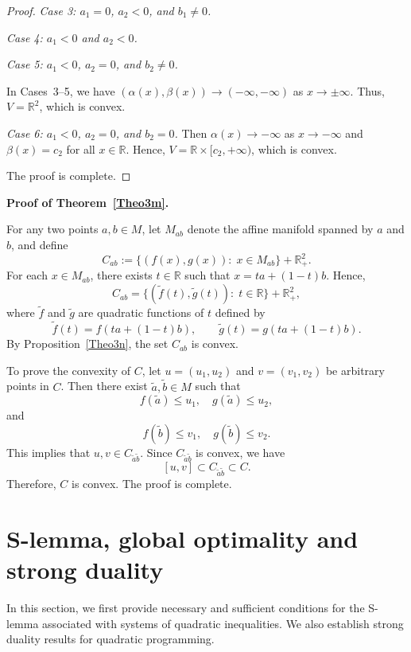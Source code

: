 \documentclass[]{interact}
\theoremstyle{plain}%
\theoremstyle{definition}
\theoremstyle{remark}
\begin{document}
\begin{proof}
		\medskip
		\noindent
		{\it Case 3: $a_1=0$, $a_2<0$, and $b_1\neq 0$.}
		
		\noindent
		{\it Case 4: $a_1<0$ and $a_2<0$.}
		
		\noindent
		{\it Case 5: $a_1<0$, $a_2=0$, and $b_2\neq 0$.}
		
		In Cases~3--5, we have $(\alpha(x),\beta(x))\to (-\infty,-\infty)$ as $x\to \pm\infty$. Thus, $V=\mathbb{R}^2$, which is convex.
		
		\medskip
		\noindent
		{\it Case 6: $a_1<0$, $a_2=0$, and $b_2=0$.}
		Then $\alpha(x)\to -\infty$ as $x\to -\infty$ and $\beta(x)=c_2$ for all $x\in \mathbb{R}$. Hence,
		$V=\mathbb{R}\times[c_2,+\infty)$, which is convex.
		
		The proof is complete.
	\end{proof}
	
	\medskip
	\noindent
	\textbf{Proof of Theorem~\ref{Theo3m}.}
	
	For any two points $a,b\in M$, let $M_{ab}$ denote the affine manifold spanned by $a$ and $b$, and define
	$$
	C_{ab}:= \{(f(x), g(x)):\; x\in M_{ab}\}+\mathbb{R}^{2}_+.
	$$
	For each $x\in M_{ab}$, there exists $t\in \mathbb{R}$ such that $x=ta+(1-t)b$. Hence,
	$$
	C_{ab}= \{(\tilde f(t), \tilde g(t)):\; t\in \mathbb{R}\}+\mathbb{R}^{2}_+,
	$$
	where $\tilde f$ and $\tilde g$ are quadratic functions of $t$ defined by
	$$
	\tilde f(t)=f(ta+(1-t)b), \qquad
	\tilde g(t)=g(ta+(1-t)b).
	$$
	By Proposition~\ref{Theo3n}, the set $C_{ab}$ is convex.
	
	To prove the convexity of $C$, let $u=(u_1,u_2)$ and $v=(v_1,v_2)$ be arbitrary points in $C$. Then there exist $\tilde a,\tilde b\in M$ such that
	$$
	f(\tilde a)\leq u_1,\quad g(\tilde a)\leq u_2,
	$$
	and
	$$
	f(\tilde b)\leq v_1,\quad g(\tilde b)\leq v_2.
	$$
	This implies that $u,v\in C_{\tilde a\tilde b}$. Since $C_{\tilde a\tilde b}$ is convex, we have
	$$
	[u,v]\subset C_{\tilde a\tilde b}\subset C.
	$$
	Therefore, $C$ is convex. The proof is complete.
	
	
	\section{S-lemma, global optimality and strong duality}
	
	In this section, we first provide necessary and sufficient conditions for the S-lemma associated with systems of quadratic inequalities. We also establish strong duality results for quadratic programming.
	
\end{document}
